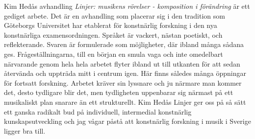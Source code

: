 \documentclass[a4paper]{article}
\begin{document}
Kim Hedås avhandling \emph{Linjer: musikens rörelser - komposition i förändring} är ett gediget arbete. Det är en avhandling som placerar sig i den tradition som Göteborgs Universitet har etablerat för konstnärlig forskning i den nya konstnärliga examensordningen. Språket är vackert, nästan poetiskt, och reflekterande. Svaren är formulerade som möjligheter, där ibland många sådana ges. Frågeställningarna, till en början en smula vaga och inte omedelbart närvarande genom hela hela arbetet flyter ibland ut till utkanten för att sedan återvända och uppträda mitt i centrum igen. Här finns således många öppningar för fortsatt forskning. Arbetet kräver sin lyssnare och ju närmare man kommer det, desto tydligare blir det, men tydligheten uppenbarar sig närmast på ett musikaliskt plan snarare än ett strukturellt. Kim Hedås Linjer ger oss på så sätt ett ganska radikalt bud på individuell, intermedial konstnärlig kunskapsutveckling och jag vågar påstå att konstnärlig forskning i musik i Sverige ligger bra till.

 
\end{document}
